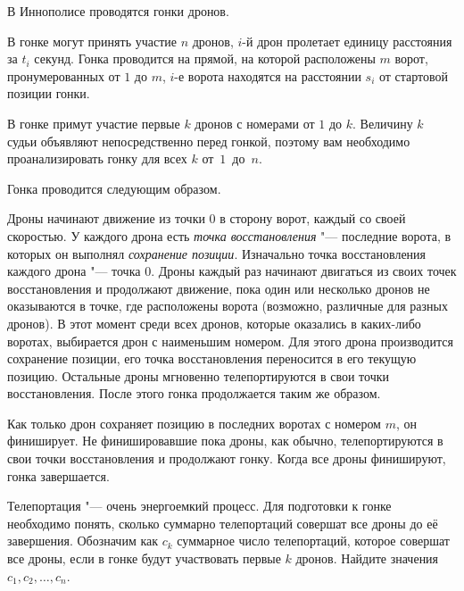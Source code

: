 В Иннополисе проводятся гонки дронов.

В гонке могут принять участие $n$ дронов, $i$-й дрон пролетает единицу расстояния за $t_i$ секунд.
Гонка проводится на прямой, на которой расположены $m$ ворот, пронумерованных от $1$ до $m$, $i$-е ворота находятся на расстоянии $s_i$ от стартовой позиции гонки.

В гонке примут участие первые $k$ дронов с номерами от $1$ до $k$. Величину $k$ судьи объявляют непосредственно перед гонкой, поэтому вам необходимо проанализировать гонку для всех $k$ от~$1$~до~$n$.

Гонка проводится следующим образом. 

Дроны начинают движение из точки $0$ в сторону ворот, каждый со своей скоростью. У каждого дрона есть \textit{точка восстановления} "--- последние ворота, в которых он выполнял \textit{сохранение позиции}. Изначально точка восстановления каждого дрона "--- точка $0$. Дроны каждый раз начинают двигаться из своих точек восстановления и продолжают движение, пока один или несколько дронов не оказываются в точке, где расположены ворота (возможно, различные для разных дронов). В этот момент среди всех дронов, которые оказались в каких-либо воротах, выбирается дрон с наименьшим номером. Для этого дрона производится сохранение позиции, его точка восстановления переносится в его текущую позицию. Остальные дроны мгновенно телепортируются в свои точки восстановления. После этого гонка продолжается таким же образом. 

Как только дрон сохраняет позицию в последних воротах с номером $m$, он финиширует. Не финишировавшие пока дроны, как обычно, телепортируются в свои точки восстановления и продолжают гонку. Когда все дроны финишируют, гонка завершается.

Телепортация "--- очень энергоемкий процесс. Для подготовки к гонке необходимо понять, сколько суммарно телепортаций совершат все дроны до её завершения. Обозначим как $c_k$ суммарное число телепортаций, которое совершат все дроны, если в гонке будут участвовать первые $k$ дронов. Найдите значения $c_1, c_2, \ldots, c_n$.
